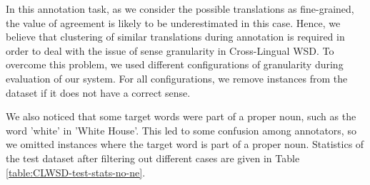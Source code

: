 {%

In this annotation task, as we consider the possible translations as  fine-grained, the value of agreement is likely to be underestimated in this case. Hence, we believe that clustering of similar translations during annotation is required in order to deal with the issue of sense granularity in Cross-Lingual WSD. 
To overcome this problem, we used different configurations of granularity during evaluation of our system. 
For all configurations,
we remove instances from the dataset if it does not have a correct sense. 



We also noticed that some target words were part of a proper noun, such as the word 'white' in 'White House'. This led to some confusion among annotators, so we omitted instances where the target word is part of a proper noun. Statistics of the test dataset after filtering out different cases are given in Table \ref{table:CLWSD-test-stats-no-ne}.

}
